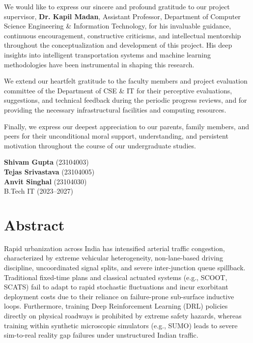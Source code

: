\documentclass[12pt,a4paper,oneside]{report}
\begin{document}
We would like to express our sincere and profound gratitude to our project supervisor, \textbf{Dr. Kapil Madan}, Assistant Professor, Department of Computer Science Engineering \& Information Technology, for his invaluable guidance, continuous encouragement, constructive criticisms, and intellectual mentorship throughout the conceptualization and development of this project. His deep insights into intelligent transportation systems and machine learning methodologies have been instrumental in shaping this research.

We extend our heartfelt gratitude to the faculty members and project evaluation committee of the Department of CSE \& IT for their perceptive evaluations, suggestions, and technical feedback during the periodic progress reviews, and for providing the necessary infrastructural facilities and computing resources.

Finally, we express our deepest appreciation to our parents, family members, and peers for their unconditional moral support, understanding, and persistent motivation throughout the course of our undergraduate studies.

\vspace{2.0cm}
\noindent
\textbf{Shivam Gupta} (23104003)\\[0.15cm]
\textbf{Tejas Srivastava} (23104005)\\[0.15cm]
\textbf{Anvit Singhal} (23104030)\\[0.2cm]
B.Tech IT (2023--2027)

\newpage

\chapter*{Abstract}

Rapid urbanization across India has intensified arterial traffic congestion, characterized by extreme vehicular heterogeneity, non-lane-based driving discipline, uncoordinated signal splits, and severe inter-junction queue spillback. Traditional fixed-time plans and classical actuated systems (e.g., SCOOT, SCATS) fail to adapt to rapid stochastic fluctuations and incur exorbitant deployment costs due to their reliance on failure-prone sub-surface inductive loops. Furthermore, training Deep Reinforcement Learning (DRL) policies directly on physical roadways is prohibited by extreme safety hazards, whereas training within synthetic microscopic simulators (e.g., SUMO) leads to severe sim-to-real reality gap failures under unstructured Indian traffic.
\end{document}
